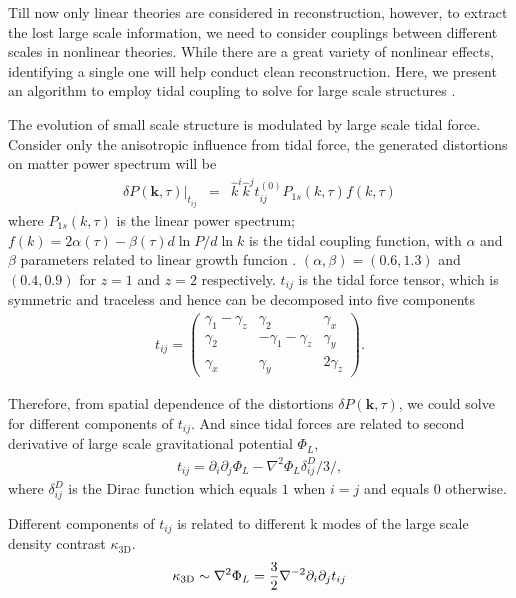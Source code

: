 Till now only linear theories are considered in reconstruction, 
however, to extract the lost large scale information, 
we need to consider couplings between different scales in nonlinear theories. 
While there are a great variety of nonlinear effects, 
identifying a single one will help conduct clean reconstruction.   
Here, we present an algorithm to employ 
tidal coupling 
to solve for large scale structures 
\cite{2015:zhu,2012:pen}.  

The evolution of small scale structure is modulated by large scale 
tidal force. 
Consider only the anisotropic influence from tidal force, 
the generated distortions on matter power spectrum will be 
\begin{eqnarray}
\label{eq:powerdistort}
\delta P(\bm{k},\tau)|_{t_{ij}}&=&
\hat{k}^i\hat{k}^jt_{ij}^{(0)}P_{1s}(k,\tau)f(k,\tau)
\end{eqnarray}
where $P_{1s}(k,\tau)$ is the linear power spectrum; 
$f(k)=2\alpha(\tau)-\beta(\tau)d\ln P/d\ln k$ is the tidal coupling function, 
with $\alpha$ and $\beta$ parameters related to linear growth funcion \cite{2015:zhu}. 
$(\alpha,\beta)=(0.6,1.3)$ and $(0.4, 0.9)$ for $z=1$ and $z=2$ respectively. 
$t_{ij}$ is the tidal force tensor, 
which is symmetric and traceless 
and hence can be decomposed into five components 
\begin{eqnarray}
t_{ij}=\left( \begin{array}{ccc}
\gamma_{1}-\gamma_{z} & \gamma_{2} & \gamma_{x}\\
\gamma_{2} & -\gamma_{1}-\gamma_{z} & \gamma_{y}\\
\gamma_{x} & \gamma_{y} & 2\gamma_z
\end{array} \right).
\end{eqnarray}

Therefore, from spatial dependence of the distortions 
$\delta P(\bm{k},\tau)$, 
we could solve for different components of $t_{ij}$. 
And since tidal forces are related to second derivative 
of large scale gravitational potential $\Phi_L$,  
\begin{eqnarray}
\label{eq:tij}
t_{ij}=\partial_i\partial_j\Phi_{L}-\nabla^2\Phi_L\delta^D_{ij}/3 /,
\end{eqnarray}
where $\delta_{ij}^D$ is the Dirac function 
which equals $1$ when $i=j$ and equals $0$ otherwise.

Different components of $t_{ij}$ is related to 
different k modes of the large scale 
density contrast $\kappa_\mathrm{3D}$.
\begin{eqnarray}
    \label{eq:largepoten}
    \kappa_\mathrm{3D}\sim\nabla^2\Phi_L=\frac{3}{2}\nabla^{-2}\partial_i\partial_j t_{ij}
\end{eqnarray}

